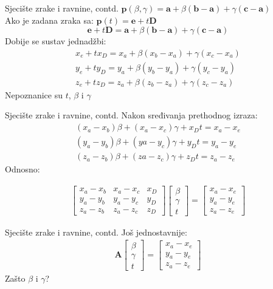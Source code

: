 \documentclass[9pt]{beamer}
\begin{document}
\begin{frame}{Sjecište zrake i ravnine, contd.}
$\textbf{p}(\beta, \gamma) = \textbf{a} + \beta(\textbf{b}-\textbf{a}) + \gamma(\textbf{c}-\textbf{a})$ 
\\
Ako je zadana zraka sa: $\textbf{p}(t) = \textbf{e}+t\textbf{D}$
$$\textbf{e}+t\textbf{D} = \textbf{a} + \beta(\textbf{b}-\textbf{a}) + \gamma(\textbf{c}-\textbf{a})$$
Dobije se sustav jednadžbi:
\begin{align*}
x_e+tx_D = x_a + \beta(x_b-x_a) + \gamma(x_c-x_a)\\
y_e+ty_D = y_a + \beta(y_b-y_a) + \gamma(y_c-y_a)\\
z_e+tz_D = z_a + \beta(z_b-z_a) + \gamma(z_c-z_a)
\end{align*}
Nepoznanice su $t$, $\beta$ i $\gamma$
\end{frame}	

\begin{frame}{Sjecište zrake i ravnine, contd.}
Nakon sređivanja prethodnog izraza:
\begin{align*}
(x_a-x_b)\beta + (x_a-x_c)\gamma + x_Dt=x_a-x_e\\
(y_a-y_b)\beta + (ya-y_c)\gamma + y_Dt=y_a-y_e\\
(z_a-z_b)\beta + (za-z_c)\gamma + z_Dt=z_a-z_e
\end{align*}
Odnosno:

\begin{align*}
\left[
\begin{array}{ccc}
x_a-x_b&  x_a-x_c&  x_D \\ 
y_a-y_b&  y_a-y_c&  y_D  \\ 
z_a-z_b&  z_a-z_c&  z_D
\end{array} 
\right]
\left[
\begin{array}{c}
\beta \\ \gamma \\ t
\end{array} 
\right] =
\left[
\begin{array}{c}
x_a-x_e \\ y_a-y_e \\ z_a-z_e
\end{array} 
\right]
\end{align*}
\end{frame}	

\begin{frame}{Sjecište zrake i ravnine, contd.}
Još jednostavnije:
\begin{align*}
\textbf{A}
\left[
\begin{array}{c}
\beta \\ \gamma \\ t
\end{array} 
\right] =
\left[
\begin{array}{c}
x_a-x_e \\ y_a-y_e \\ z_a-z_e
\end{array} 
\right]
\end{align*}
Zašto $\beta$ i $\gamma$?
\end{frame}
\end{document}
